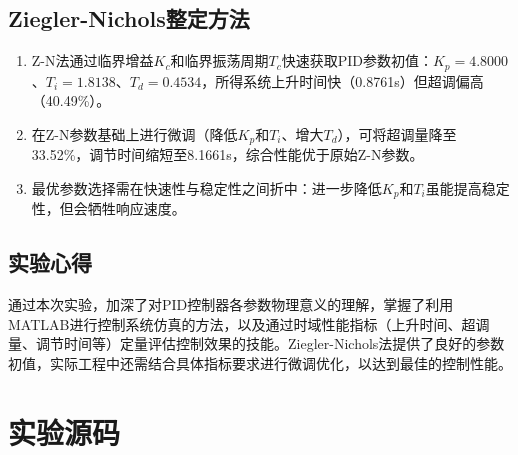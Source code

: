 \documentclass{../common/SCNU_Experimental_Report}
\begin{document}
\subsection{Ziegler-Nichols整定方法}
\begin{enumerate}
    \item Z-N法通过临界增益\(K_c\)和临界振荡周期\(T_c\)快速获取PID参数初值：\(K_p = 4.8000\)、\(T_i = 1.8138\)、\(T_d = 0.4534\)，所得系统上升时间快（0.8761s）但超调偏高（40.49\%）。
    \item 在Z-N参数基础上进行微调（降低\(K_p\)和\(T_i\)、增大\(T_d\)），可将超调量降至33.52\%，调节时间缩短至8.1661s，综合性能优于原始Z-N参数。
    \item 最优参数选择需在快速性与稳定性之间折中：进一步降低\(K_p\)和\(T_i\)虽能提高稳定性，但会牺牲响应速度。
\end{enumerate}

\subsection{实验心得}
通过本次实验，加深了对PID控制器各参数物理意义的理解，掌握了利用MATLAB进行控制系统仿真的方法，以及通过时域性能指标（上升时间、超调量、调节时间等）定量评估控制效果的技能。Ziegler-Nichols法提供了良好的参数初值，实际工程中还需结合具体指标要求进行微调优化，以达到最佳的控制性能。

\section{实验源码}
\end{document}
